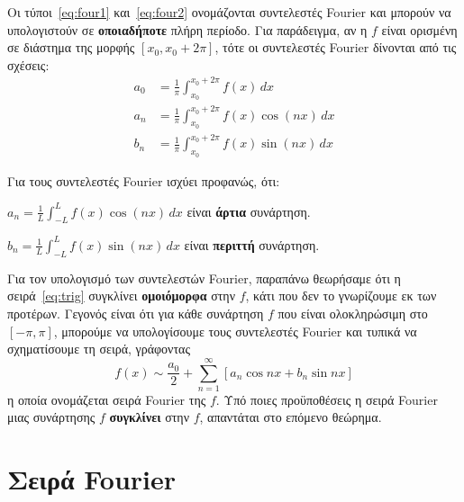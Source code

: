   \begin{rem}
    Οι τύποι~\eqref{eq:four1} και~\eqref{eq:four2} ονομάζονται 
    \textcolor{Col1}{συντελεστές Fourier} και μπορούν να υπολογιστούν σε 
    \textbf{οποιαδήποτε} πλήρη περίοδο.  Για παράδειγμα, αν η $f$ είναι ορισμένη σε 
    διάστημα της μορφής $ [x_{0}, x_{0}+2 \pi] $, τότε οι συντελεστές 
    Fourier δίνονται από τις σχέσεις:
    \begin{align*}
      a_{0} &= \frac{1}{\pi} \int _{x_{0}}^{x_{0}+ 2 \pi }f(x) \,{dx} \\
      a_{n} &= \frac{1}{\pi} \int _{x_{0}}^{x_{0}+ 2 \pi } f(x) \cos{(nx)} \,{dx}  \\
      b_{n} &= \frac{1}{\pi} \int _{x_{0}}^{x_{0}+ 2 \pi } f(x) \sin{(nx)} \,{dx}  
    \end{align*} 
  \end{rem}

  \begin{rem}
    Για τους συντελεστές Fourier ισχύει προφανώς, ότι:
    \begin{myitemize}
      \item $ a_{n} = \frac{1}{L} \int _{-L}^{L} f(x) \cos{(nx)} \,{dx} $ είναι
        \textbf{άρτια} συνάρτηση.
      \item $ b_{n} = \frac{1}{L} \int _{-L}^{L} f(x) \sin{(nx)} \,{dx} $ είναι
        \textbf{περιττή} συνάρτηση.
    \end{myitemize}
  \end{rem}

  \begin{rem}
    Για τον υπολογισμό των συντελεστών Fourier, παραπάνω θεωρήσαμε ότι η 
    σειρά~\eqref{eq:trig} συγκλίνει \textbf{ομοιόμορφα} στην $f$, κάτι που δεν το 
    γνωρίζουμε εκ των προτέρων.  Γεγονός είναι ότι για κάθε συνάρτηση $f$ που είναι 
    ολοκληρώσιμη στο $ [- \pi , \pi] $, μπορούμε να υπολογίσουμε τους συντελεστές 
    Fourier και τυπικά να σχηματίσουμε τη σειρά, γράφοντας
    \[
      f(x) \sim \frac{a_{0}}{2} + \sum_{n=1}^{\infty} [a_{n} \cos{nx} + b_{n} \sin{nx}]
    \] 
    η οποία ονομάζεται σειρά \textcolor{Col1}{Fourier} της $f$. Υπό ποιες προϋποθέσεις η 
    σειρά Fourier μιας συνάρτησης $f$ \textbf{συγκλίνει} στην $f$, απαντάται στο επόμενο 
    θεώρημα.
  \end{rem}



  \section{Σειρά Fourier}

